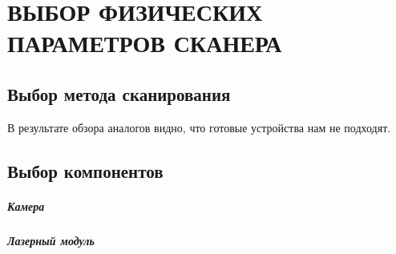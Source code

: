 \chapter{ВЫБОР ФИЗИЧЕСКИХ ПАРАМЕТРОВ СКАНЕРА}
    \section{Выбор метода сканирования}
        В результате обзора аналогов видно, что готовые устройства нам не подходят.
    
    \section{Выбор компонентов}
        \paragraph{Камера}
        
        \paragraph{Лазерный модуль}